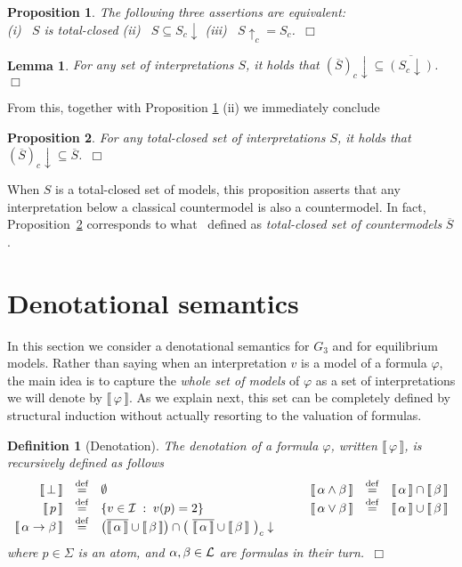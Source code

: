 \documentclass{tlp}
\newcommand{\eqdef}{\mathbin{\stackrel{\mathrm{def}}{=}}}
\def\cI{{\cal I}}
\def\down{\downarrow}
\def\up{\uparrow}
\def\L{{\cal L}}
\newcommand\non[1]{\overline{#1} }
\newcommand{\den}[1]{\llbracket \, #1 \, \rrbracket}
\def\qed{~\hfill$\Box$}
\newtheorem{definition}{Definition}
\newtheorem{lemma}{Lemma}
\newtheorem{proposition}{Proposition}
\begin{document}
\begin{proposition}\label{prop:totalc} 
The following three assertions are equivalent:\\
(i) \ $S$ is total-closed
\hspace{45pt}
(ii) \ $S\subseteq S_c \down$
\hspace{45pt}
(iii) \ $S \up_c = S_c$.\qed
\end{proposition}

\begin{lemma}\label{lem:cm} 
For any set of interpretations $S$, it holds that $(\non{S})_c \down \subseteq \non{(S_c \down)}$.\qed
\end{lemma}
From this, together with Proposition \ref{prop:totalc} (ii) we immediately conclude
\begin{proposition}\label{prop:cm} 
For any total-closed set of interpretations $S$, it holds that $(\non{S})_c \down \subseteq \non{S}$.\qed
\end{proposition}
\noindent When $S$ is a total-closed set of models, this proposition asserts that any interpretation below a classical countermodel is also a countermodel. In fact, Proposition~\ref{prop:cm} corresponds to what~\cite{CF07} defined as \emph{total-closed set of countermodels} $\non{S}$.




\section{Denotational semantics}
\label{sec:zero}

In this section we consider a denotational semantics for $G_3$ and for equilibrium models. Rather than saying when an interpretation $v$ is a model of a formula $\varphi$, the main idea is to capture the \emph{whole set of models} of $\varphi$ as a set of interpretations we will denote by $\den{\varphi}$. As we explain next, this set can be completely defined by structural induction without actually resorting to the valuation of formulas.

\begin{definition}[Denotation]
The \emph{denotation} of a formula $\varphi$, written $\den{\varphi}$, is recursively defined as follows
\[
\begin{array}{rcl@{\hspace{30pt}}rcl}
\den{\bot} & \eqdef & \emptyset &
\den{\alpha \wedge \beta} & \eqdef & \den{\alpha} \cap \den{\beta}\\
\den{p} & \eqdef & \{v \in \cI \; : \; v(p)=2 \} &
\den{\alpha \vee \beta} & \eqdef & \den{\alpha} \cup \den{\beta} \\
\den{ \alpha \rightarrow \beta} & \eqdef & \big( \non{\den{\alpha}} \cup \den{\beta} \big) \cap \big( \ \non{\den{\alpha}} \cup \den{\beta} \ \big)_c\down 
\end{array}
\]
\noindent where $p \in \Sigma$ is an atom, and $\alpha, \beta \in \L$ are formulas in their turn.\qed 
\end{definition}
\end{document}
